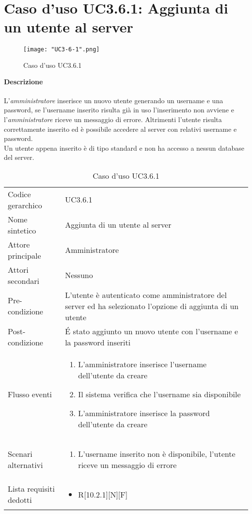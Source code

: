 \documentclass[a4paper]{report}
\begin{document}
	 \section{Caso d'uso UC3.6.1: Aggiunta di un utente al server}
	 \begin{figure}[H]
			\centering
			\texttt{[image: "UC3-6-1".png]}
			\caption{Caso d'uso UC3.6.1}
		\end{figure}
	 \textbf{Descrizione} \\ \\
	 L'\emph{amministratore} inserisce un nuovo utente generando un username e una password, se 
	 l'username inserito risulta già in uso l'inserimento non avviene e l'\emph{amministratore} riceve un
	 messaggio di errore. Altrimenti l'utente risulta correttamente inserito ed è possibile accedere al server
	 con relativi username e password. \\
	 Un utente appena inserito è di tipo standard e non ha accesso a nessun database del server.
		\begin{table}[H]
		\begin{tabularx}{\textwidth}{X | X}\toprule
			\rowcolor{orange!65}Codice gerarchico & UC3.6.1 \\
			Nome sintetico & Aggiunta di un utente al server \\
			\rowcolor{orange!65}Attore principale & Amministratore\\
			Attori secondari & Nessuno \\
			\rowcolor{orange!65}Pre-condizione & L'utente è autenticato come amministratore del server ed
			 ha selezionato l'opzione di aggiunta di un utente\\
			Post-condizione & \'E stato aggiunto un nuovo utente con l'username e la password inseriti\\
			\rowcolor{orange!65}Flusso eventi & \begin{enumerate}
			\item L'amministratore inserisce l'username dell'utente da creare
			\item Il sistema verifica che l'username sia disponibile
			\item L'amministratore inserisce la password dell'utente da creare
			\end{enumerate} \\
			Scenari alternativi & \begin{enumerate}
			\item L'username inserito non è disponibile, l'utente riceve un messaggio di errore
			\end{enumerate} \\
			\rowcolor{orange!65}Lista requisiti dedotti & \begin{itemize}
				\item R[10.2.1][N][F]
				\end{itemize} \\
			\bottomrule
		\end{tabularx}
		\caption{Caso d'uso UC3.6.1}
	 \end{table}
\end{document}
